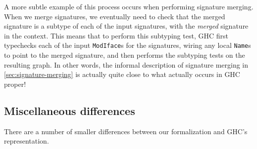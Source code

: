 A more subtle example of this process occurs when performing
signature merging.  When we merge signatures, we eventually need
to check that the merged signature is a subtype of each of the
input signatures, with the \emph{merged} signature in the context.
This means that to perform this subtyping test, GHC first typechecks
each of the input \verb|ModIface|s for the signatures, wiring any
local \verb|Name|s to point to the merged signature, and then performs
the subtyping tests on the resulting graph.  In other words, the
informal description of signature merging in \cref{sec:signature-merging}
is actually quite close to what actually occurs in GHC proper!

\subsection{Miscellaneous differences}

There are a number of smaller differences between our formalization
and GHC's representation.

